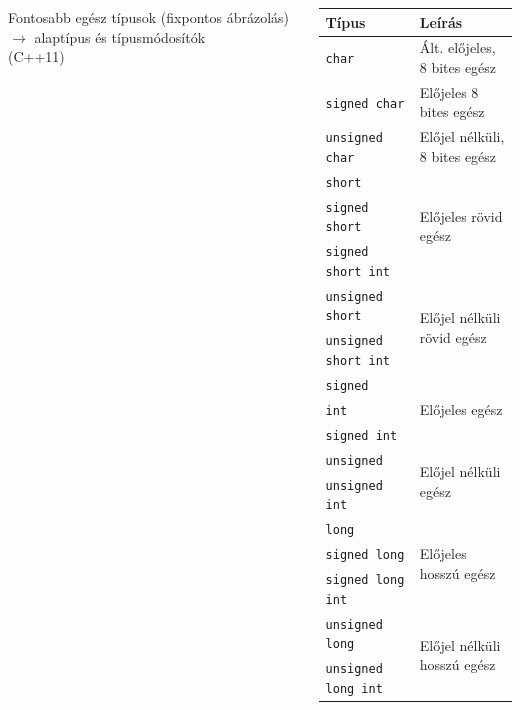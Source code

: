 \documentclass[usenames,dvipsnames,aspectratio=169]{beamer}
\begin{document}
\begin{frame}
  \begin{columns}[c]
      Fontosabb egész típusok (fixpontos ábrázolás) $\to$ alaptípus és típusmódosítók\\
      \smallskip
       (C++11)
      \scriptsize
      \vspace{-.2cm}
      \begin{center}
        \begin{tabular}{ll}
          Típus & Leírás \\ \hline\hline
          \texttt{char} & Ált. előjeles, 8 bites egész \\ \hline
          \texttt{signed char} & Előjeles 8 bites egész \\ \hline
          \texttt{unsigned char} & Előjel nélküli, 8 bites egész \\ \hline
          \texttt{short} & \multirow{3}{*}{Előjeles rövid egész} \\
          \texttt{signed short} & \\
          \texttt{signed short int} & \\ \hline
          \texttt{unsigned short} & \multirow{2}{*}{Előjel nélküli rövid egész} \\
          \texttt{unsigned short int} & \\ \hline
          \texttt{signed} & \multirow{3}{*}{Előjeles egész} \\
          \texttt{int} & \\
          \texttt{signed int} & \\ \hline
          \texttt{unsigned} & \multirow{2}{*}{Előjel nélküli egész} \\
          \texttt{unsigned int} & \\ \hline
          \texttt{long} & \multirow{3}{*}{Előjeles hosszú egész} \\
          \texttt{signed long} & \\
          \texttt{signed long int} & \\ \hline
          \texttt{unsigned long} & \multirow{2}{*}{Előjel nélküli hosszú egész} \\
          \texttt{unsigned long int} & \\
        \end{tabular}
      \end{center}
  \end{columns}
\end{frame}
\end{document}
